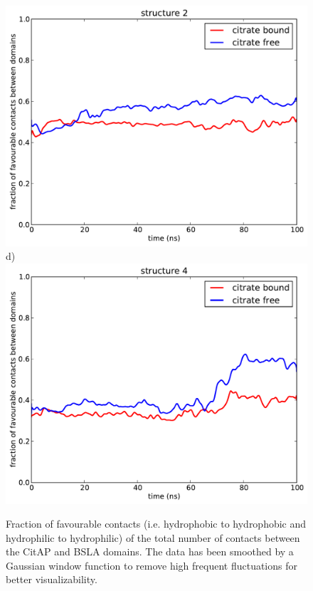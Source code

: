 \documentclass[english, a4paper, 12pt, titlepage, draft]{article}
\begin{document}
\begin{figure}
\begin{minipage}[]{0.45\linewidth}
        \includegraphics[width=\textwidth]{figures/Complex_hydrophobic_core/favourable_cont_structure2.pdf}  
        d)
        \includegraphics[width=\textwidth]{figures/Complex_hydrophobic_core/favourable_cont_structure4.pdf}  
    \end{minipage}
    \caption{Fraction of favourable contacts (i.e. hydrophobic to hydrophobic and hydrophilic to hydrophilic) of the total number of contacts between the CitAP and BSLA domains.
        The data has been smoothed by a Gaussian window function to remove high frequent fluctuations for better visualizability.}
\label{fig:favourable_contacts}
\end{figure}   
\end{document}
